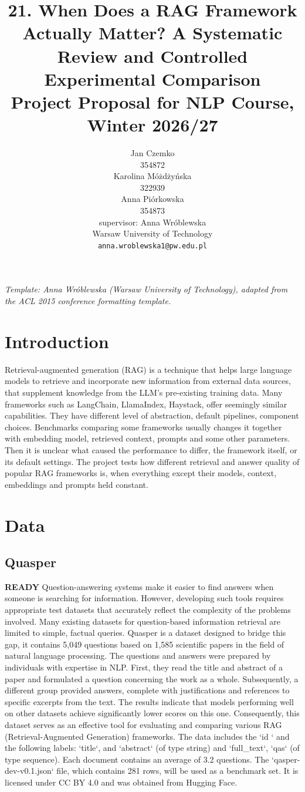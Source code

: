 \documentclass[11pt]{article}
\title{21. When Does a RAG Framework Actually Matter? A Systematic Review
and Controlled Experimental Comparison
\\Project Proposal for NLP Course, Winter 2026/27}
\author{Jan Czemko \\
  354872 \\\And
  Karolina Móżdżyńska \\
  322939 \\ \And
  Anna Piórkowska \\
  354873  \\ \AND
  supervisor: Anna Wróblewska\\
  Warsaw University of Technology \\
  {\tt anna.wroblewska1@pw.edu.pl}}
\date{}
\begin{document}
\maketitle

{\small\em Template: Anna Wróblewska (Warsaw University of Technology), adapted from the ACL 2015 conference formatting template.}
\vspace{4pt}

\section{Introduction}
Retrieval-augmented generation (RAG) is a technique that helps large language models to retrieve and incorporate new information from external data sources, that supplement knowledge from the LLM's pre-existing training data. 
Many frameworks such as LangChain, LlamaIndex, Haystack, offer seemingly similar capabilities. They have different level of abstraction, default pipelines, component choices. Benchmarks comparing some frameworks usually changes it together with embedding model, retrieved context, prompts and some other parameters. Then it is unclear what caused the performance to differ, the framework itself, or its default settings. The project tests how different retrieval and answer quality of popular RAG frameworks is, when everything except their models, context, embeddings and prompts held constant. \\
\section{Data}
\subsection{Quasper}
\textbf{READY} Question-answering systems make it easier to find answers when someone is searching for information. However, developing such tools requires appropriate test datasets that accurately reflect the complexity of the problems involved. Many existing datasets for question-based information retrieval are limited to simple, factual queries. Quasper is a dataset designed to bridge this gap, it contains 5,049 questions based on 1,585 scientific papers in the field of natural language processing. The questions and answers were prepared by individuals with expertise in NLP. First, they read the title and abstract of a paper and formulated a question concerning the work as a whole. Subsequently, a different group provided answers, complete with justifications and references to specific excerpts from the text. The results indicate that models performing well on other datasets achieve significantly lower scores on this one. Consequently, this dataset serves as an effective tool for evaluating and comparing various RAG (Retrieval-Augmented Generation) frameworks. The data includes the `id ` and the following labels: `title`, and `abstract` (of type string) and `full\_text`, `qas` (of type sequence). Each document contains an average of 3.2 questions. The `qasper-dev-v0.1.json` file, which contains 281 rows, will be used as a benchmark set. It is licensed under CC BY 4.0 and was obtained from Hugging Face.
\end{document}
